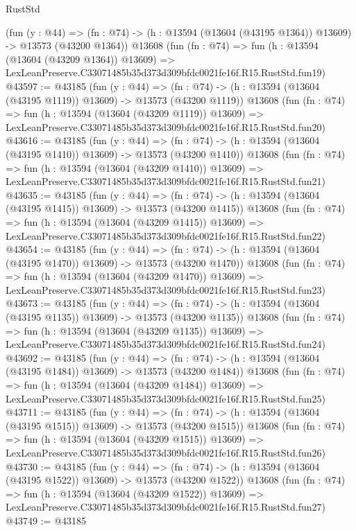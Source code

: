 \begin{lexlean}{RustStd}
\begin{coremodule}
    (fun (y : @44) =>
    (fn : @74) -> (h : @13594 (@13604 (@43195 @1364)) @13609) -> @13573 (@43200 @1364))
    @13608
    (fun (fn : @74) =>
    fun (h : @13594 (@13604 (@43209 @1364)) @13609) =>
    LexLeanPreserve.C33071485b35d373d309bfdc0021fe16f.R15.RustStd.fun19)
@43597 := @43185
    (fun (y : @44) =>
    (fn : @74) -> (h : @13594 (@13604 (@43195 @1119)) @13609) -> @13573 (@43200 @1119))
    @13608
    (fun (fn : @74) =>
    fun (h : @13594 (@13604 (@43209 @1119)) @13609) =>
    LexLeanPreserve.C33071485b35d373d309bfdc0021fe16f.R15.RustStd.fun20)
@43616 := @43185
    (fun (y : @44) =>
    (fn : @74) -> (h : @13594 (@13604 (@43195 @1410)) @13609) -> @13573 (@43200 @1410))
    @13608
    (fun (fn : @74) =>
    fun (h : @13594 (@13604 (@43209 @1410)) @13609) =>
    LexLeanPreserve.C33071485b35d373d309bfdc0021fe16f.R15.RustStd.fun21)
@43635 := @43185
    (fun (y : @44) =>
    (fn : @74) -> (h : @13594 (@13604 (@43195 @1415)) @13609) -> @13573 (@43200 @1415))
    @13608
    (fun (fn : @74) =>
    fun (h : @13594 (@13604 (@43209 @1415)) @13609) =>
    LexLeanPreserve.C33071485b35d373d309bfdc0021fe16f.R15.RustStd.fun22)
@43654 := @43185
    (fun (y : @44) =>
    (fn : @74) -> (h : @13594 (@13604 (@43195 @1470)) @13609) -> @13573 (@43200 @1470))
    @13608
    (fun (fn : @74) =>
    fun (h : @13594 (@13604 (@43209 @1470)) @13609) =>
    LexLeanPreserve.C33071485b35d373d309bfdc0021fe16f.R15.RustStd.fun23)
@43673 := @43185
    (fun (y : @44) =>
    (fn : @74) -> (h : @13594 (@13604 (@43195 @1135)) @13609) -> @13573 (@43200 @1135))
    @13608
    (fun (fn : @74) =>
    fun (h : @13594 (@13604 (@43209 @1135)) @13609) =>
    LexLeanPreserve.C33071485b35d373d309bfdc0021fe16f.R15.RustStd.fun24)
@43692 := @43185
    (fun (y : @44) =>
    (fn : @74) -> (h : @13594 (@13604 (@43195 @1484)) @13609) -> @13573 (@43200 @1484))
    @13608
    (fun (fn : @74) =>
    fun (h : @13594 (@13604 (@43209 @1484)) @13609) =>
    LexLeanPreserve.C33071485b35d373d309bfdc0021fe16f.R15.RustStd.fun25)
@43711 := @43185
    (fun (y : @44) =>
    (fn : @74) -> (h : @13594 (@13604 (@43195 @1515)) @13609) -> @13573 (@43200 @1515))
    @13608
    (fun (fn : @74) =>
    fun (h : @13594 (@13604 (@43209 @1515)) @13609) =>
    LexLeanPreserve.C33071485b35d373d309bfdc0021fe16f.R15.RustStd.fun26)
@43730 := @43185
    (fun (y : @44) =>
    (fn : @74) -> (h : @13594 (@13604 (@43195 @1522)) @13609) -> @13573 (@43200 @1522))
    @13608
    (fun (fn : @74) =>
    fun (h : @13594 (@13604 (@43209 @1522)) @13609) =>
    LexLeanPreserve.C33071485b35d373d309bfdc0021fe16f.R15.RustStd.fun27)
@43749 := @43185

\end{coremodule}
\end{lexlean}

